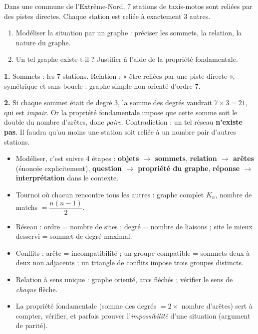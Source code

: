 \documentclass[11pt]{article}
\begin{document}
\begin{exercice}
Dans une commune de l'Extrême-Nord, 7 stations de taxis-motos sont reliées par des pistes directes. Chaque station est reliée à exactement 3 autres.
\begin{enumerate}
\item Modéliser la situation par un graphe : préciser les sommets, la relation, la nature du graphe.
\item Un tel graphe existe-t-il ? Justifier à l'aide de la propriété fondamentale.
\end{enumerate}
\end{exercice}

\begin{corrige}
\textbf{1.} Sommets : les 7 stations. Relation : « être reliées par une piste directe », symétrique et sans boucle : graphe simple non orienté d'ordre 7.

\textbf{2.} Si chaque sommet était de degré 3, la somme des degrés vaudrait $7 \times 3 = 21$, qui est \emph{impair}. Or la propriété fondamentale impose que cette somme soit le double du nombre d'arêtes, donc \emph{paire}. Contradiction : un tel réseau \textbf{n'existe pas}. Il faudra qu'au moins une station soit reliée à un nombre pair d'autres stations.
\end{corrige}

\begin{aretenir}
\begin{itemize}
\item Modéliser, c'est suivre 4 étapes : \textbf{objets $\rightarrow$ sommets}, \textbf{relation $\rightarrow$ arêtes} (énoncée explicitement), \textbf{question $\rightarrow$ propriété du graphe}, \textbf{réponse $\rightarrow$ interprétation} dans le contexte.
\item Tournoi où chacun rencontre tous les autres : graphe complet $K_n$, nombre de matchs $= \dfrac{n(n-1)}{2}$.
\item Réseau : ordre = nombre de sites ; degré = nombre de liaisons ; site le mieux desservi = sommet de degré maximal.
\item Conflits : arête = incompatibilité ; un groupe compatible = sommets deux à deux non adjacents ; un triangle de conflits impose trois groupes distincts.
\item Relation à sens unique : graphe orienté, arcs fléchés ; vérifier le sens de \emph{chaque} flèche.
\item La propriété fondamentale (somme des degrés $= 2 \times$ nombre d'arêtes) sert à compter, vérifier, et parfois prouver l'\emph{impossibilité} d'une situation (argument de parité).
\end{itemize}
\end{aretenir}
\end{document}

